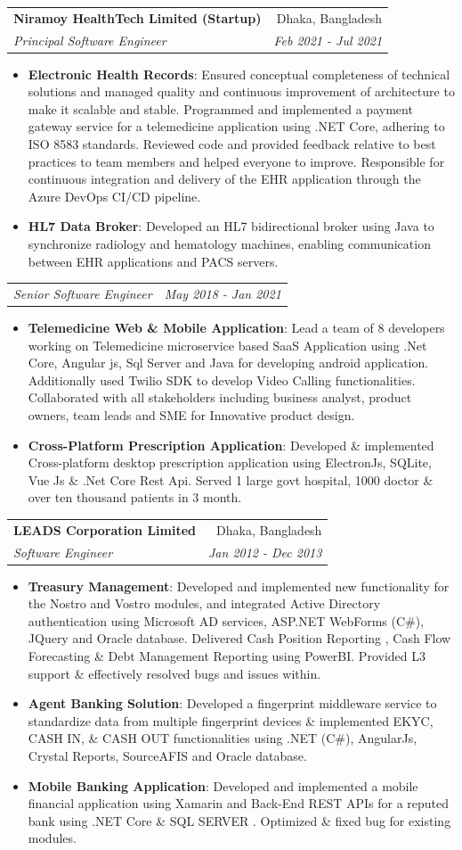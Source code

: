 \documentclass[letterpaper,11pt]{article}
\makeatletter
\newcommand{\resumeItem}[2]{
  \item\small{
    \textbf{#1}{: #2 \vspace{-2pt}}
  }
}
\newcommand{\resumeSubheading}[4]{
  \vspace{-1pt}\item
    \begin{tabular*}{0.97\textwidth}[t]{l@{\extracolsep{\fill}}r}
      \textbf{#1} & #2 \\
      \textit{\small#3} & \textit{\small #4} \\
    \end{tabular*}\vspace{-5pt}
}
\newcommand{\resumeSubSubheading}[2]{
    \begin{tabular*}{0.97\textwidth}{l@{\extracolsep{\fill}}r}
      \textit{\small#1} & \textit{\small #2} \\
    \end{tabular*}\vspace{-5pt}
}
\newcommand{\resumeItemListStart}{\begin{itemize}}
\newcommand{\resumeItemListEnd}{\end{itemize}\vspace{-5pt}}
\makeatother
\begin{document}
    \resumeSubheading
      {Niramoy HealthTech Limited (Startup) }{Dhaka, Bangladesh}
      {Principal Software Engineer}{Feb 2021 - Jul 2021}
      \resumeItemListStart
        \resumeItem{Electronic Health Records}
          {Ensured conceptual completeness of technical solutions and managed quality and continuous improvement of architecture to make it scalable and stable. 
          Programmed and implemented a payment gateway service for a telemedicine application using .NET Core, adhering to ISO 8583 standards. 
          Reviewed code and provided feedback relative to best practices to team members and helped everyone to improve.
          Responsible for continuous integration and delivery of the EHR application through the Azure DevOps CI/CD pipeline.}
        \resumeItem{HL7 Data Broker}
          {Developed an HL7 bidirectional broker using Java to synchronize radiology and hematology machines, enabling communication between EHR applications and PACS servers. \newline \newline \newline \newline}
      \resumeItemListEnd
      \resumeSubSubheading
      {Senior Software Engineer}{May 2018 - Jan 2021}
      \resumeItemListStart
        \resumeItem{Telemedicine Web \& Mobile Application}
         {Lead a team of 8 developers working on Telemedicine microservice based SaaS Application using .Net Core, Angular js, Sql Server and Java for developing android application. Additionally used Twilio SDK to develop Video Calling functionalities. Collaborated with all stakeholders including business analyst, product owners, team leads and
         SME for Innovative product design.}
        \resumeItem{Cross-Platform Prescription Application}
         {Developed \& implemented Cross-platform desktop prescription application using ElectronJs, SQLite,  Vue Js \& .Net Core Rest Api. Served 1 large govt hospital, 1000 doctor \& over ten thousand patients in 3 month.}
    \resumeItemListEnd
    
    \resumeSubheading
      {LEADS Corporation Limited}{Dhaka, Bangladesh}
      {Software Engineer}{Jan 2012 - Dec 2013}
      \resumeItemListStart
      \resumeItem{Treasury Management}
      {Developed and implemented new functionality for the Nostro and Vostro modules, and integrated Active Directory authentication using Microsoft AD services, ASP.NET WebForms (C\#), JQuery and Oracle database. Delivered Cash Position Reporting , Cash Flow Forecasting \& Debt Management Reporting using PowerBI. Provided L3 support \& effectively resolved bugs and issues within.}
        \resumeItem{Agent Banking Solution}
          {Developed a fingerprint middleware service to standardize data from multiple fingerprint devices \& implemented EKYC, CASH IN, \& CASH OUT functionalities using .NET (C\#), AngularJs, Crystal Reports, SourceAFIS and Oracle database.}
        \resumeItem{Mobile Banking Application}
          {Developed and implemented a mobile financial application using Xamarin and  Back-End REST APIs for a reputed bank using .NET Core \& SQL SERVER . Optimized \& fixed bug for existing modules. }
      \resumeItemListEnd
\end{document}
